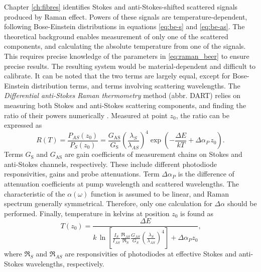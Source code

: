 \documentclass{standalone}
\begin{document}
Chapter \ref{ch:fibres} identifies Stokes and anti-Stokes-shifted scattered signals produced by Raman effect. Powers of these signals are temperature-dependent, following Bose-Einstein distributions in equations \ref{eq:be-s} and \ref{eq:be-as}. The theoretical background enables measurement of only one of the scattered components, and calculating the absolute temperature from one of the signals. This requires precise knowledge of the parameters in \ref{eq:raman_beer} to ensure precise results. The resulting system would be material-dependent and difficult to calibrate. It can be noted that the two terms are largely equal, except for Bose-Einstein distribution terms, and terms involving scattering wavelengths. The \textit{Differential anti-Stokes Raman thermometry} method (abbr. DART) relies on measuring both Stokes and anti-Stokes scattering components, and finding the ratio of their powers numerically \cite{novelMethod2010}. Measured at point $z_0$, the ratio can be expressed as
\begin{equation}
R(T) = \frac{P_{AS}(z_0)}{P_S(z_0)} = \frac{G_\textrm{AS}}{G_\textrm{S}} \left( \frac{\lambda_S}{\lambda_{AS}} \right)^4 \exp\left( - \frac{\varDelta E}{k T} + \varDelta \alpha_P \, z_0 \right) \textrm{.}
\end{equation}
Terms $G_\textrm{S}$ and $G_\textrm{AS}$ are gain coefficients of measurement chains on Stokes and anti-Stokes channels, respectively. These include different photodiode responsivities, gains and probe attenuations. Term $\varDelta \alpha_P$ is the difference of attenuation coefficients at pump wavelength and scattered wavelengths. The characteristic of the $\alpha(\omega)$ function is assumed to be linear, and Raman spectrum generally symmetrical. Therefore, only one calculation for $\varDelta \alpha$ should be performed. Finally, temperature in kelvins at position $z_0$ is found as
\begin{equation} \label{eq:stokes_temperature}
T(z_0) = \frac{\varDelta E}{k \, \ln \left[ \frac{I_S}{I_{AS}} \frac{\Re_{AS}}{\Re_S} \frac{G_{AS}}{G_S} \left(\frac{\lambda_S}{\lambda_{AS}}\right)^4 \right] + \varDelta \alpha_P z_0 } \textrm{,}
\end{equation}
where $\Re_S$ and $\Re_{AS}$ are responsivities of photodiodes at effective Stokes and anti-Stokes wavelengths, respectively.



\setcounter{stranica}{\thepage}
\addtocounter{stranica}{1}
\end{document}
